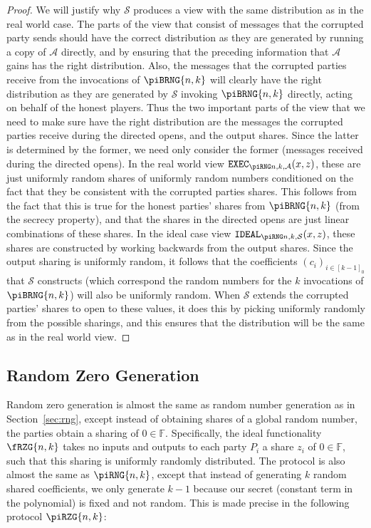 \documentclass{article}
\newcommand{\seqZ}[1]{\left[#1\right]_0}
\theoremstyle{remark}
\newcommand{\F}{\mathbb{F}}
\begin{document}
\begin{proof}
	We will justify why $\mathcal{S}$ produces a view with the same
	distribution as in the real world case. The parts of the view that consist
	of messages that the corrupted party sends should have the correct
	distribution as they are generated by running a copy of $\mathcal{A}$
	directly, and by ensuring that the preceding information that $\mathcal{A}$
	gains has the right distribution. Also, the messages that the corrupted
	parties receive from the invocations of $\piBRNG{n,k}$ will clearly have
	the right distribution as they are generated by $\mathcal{S}$ invoking
	$\piBRNG{n,k}$ directly, acting on behalf of the honest players. Thus the
	two important parts of the view that we need to make sure have the right
	distribution are the messages the corrupted parties receive during the
	directed opens, and the output shares. Since the latter is determined by
	the former, we need only consider the former (messages received during the
	directed opens). In the real world view $\execD$, these are just uniformly
	random shares of uniformly random numbers conditioned on the fact that they
	be consistent with the corrupted parties shares. This follows from the fact
	that this is true for the honest parties' shares from $\piBRNG{n,k}$ (from
	the secrecy property), and that the shares in the directed opens are just
	linear combinations of these shares. In the ideal case view $\idealD$,
	these shares are constructed by working backwards from the output shares.
	Since the output sharing is uniformly random, it follows that the
	coefficients ${(c_i)}_{i \in \seqZ{k-1}}$ that $\mathcal{S}$ constructs
	(which correspond the random numbers for the $k$ invocations of
	$\piBRNG{n,k}$) will also be uniformly random. When $\mathcal{S}$ extends
	the corrupted parties' shares to open to these values, it does this by
	picking uniformly randomly from the possible sharings, and this ensures
	that the distribution will be the same as in the real world view.
\end{proof}

\subsection{Random Zero Generation}\label{sec:rzg}

Random zero generation is almost the same as random number generation as in
Section~\ref{sec:rng}, except instead of obtaining shares of a global random
number, the parties obtain a sharing of $0 \in \F$. Specifically, the ideal
functionality $\fRZG{n,k}$ takes no inputs and outputs to each party $P_i$ a
share $z_i$ of $0 \in \F$, such that this sharing is uniformly randomly
distributed. The protocol is also almost the same as $\piRNG{n,k}$, except that
instead of generating $k$ random shared coefficients, we only generate $k-1$
because our secret (constant term in the polynomial) is fixed and not random.
This is made precise in the following protocol $\piRZG{n,k}$:
\end{document}
